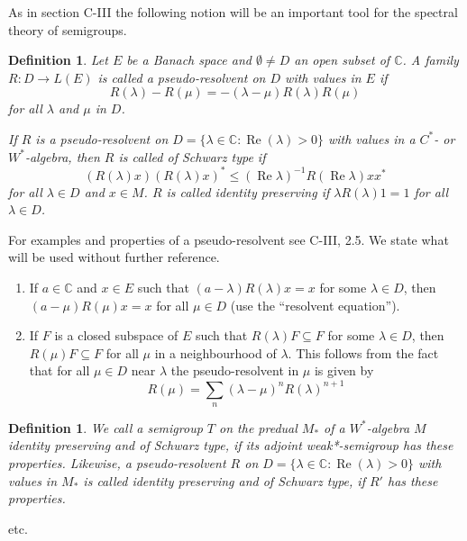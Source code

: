 \documentclass[a4paper, fontsize=11pt, oneside]{scrbook}
\newtheorem{definition}[theorem]{Definition}
\begin{document}
As in section C-III the following notion will be an important tool for the spectral theory of semigroups.

\begin{definition} 
Let $E$ be a Banach space and $\emptyset \neq D$ an open subset of $\mathbb{C}$.
A family $R: D \rightarrow L(E)$ is called a pseudo-resolvent on $D$ with values in $E$ if
\[
R(\lambda)-R(\mu)=-(\lambda-\mu)R(\lambda)R(\mu)
\]
for all $\lambda$ and $\mu$ in $D$.

If $R$ is a pseudo-resolvent on $D=\{\lambda \in \mathbb{C}: \operatorname{Re}(\lambda) > 0\}$ with values in a $C^{*}$- or $W^{*}$-algebra, then $R$ is called of Schwarz type if
\[
(R(\lambda)x)(R(\lambda)x)^{*} \leq (\operatorname{Re}\lambda)^{-1}R(\operatorname{Re}\lambda)xx^{*}
\]
for all $\lambda \in D$ and $x \in M$.
$R$ is called identity preserving if $\lambda R(\lambda)1 = 1$ for all $\lambda \in D$.
\end{definition}

For examples and properties of a pseudo-resolvent see C-III, 2.5.
We state what will be used without further reference.

\begin{enumerate}
\item
If $a \in \mathbb{C}$ and $x \in E$ such that $(a-\lambda)R(\lambda)x = x$ for some $\lambda \in D$, then $(a-\mu)R(\mu)x = x$ for all $\mu \in D$ (use the \enquote{resolvent equation}).

\item
If $F$ is a closed subspace of $E$ such that $R(\lambda)F \subseteq F$ for some $\lambda \in D$, then $R(\mu)F \subseteq F$ for all $\mu$ in a neighbourhood of $\lambda$.
This follows from the fact that for all $\mu \in D$ near $\lambda$ the pseudo-resolvent in $\mu$ is given by
\[
R(\mu) = \sum_{n}(\lambda-\mu)^n R(\lambda)^{n+1}
\]

\end{enumerate}

 
\begin{definition} 
We call a semigroup $T$ on the predual $M_{*}$ of a $W^{*}$-algebra $M$ identity preserving and of Schwarz type, if its adjoint weak*-semigroup has these properties.
Likewise, a pseudo-resolvent $R$ on $D=\{\lambda \in \mathbb{C}: \operatorname{Re}(\lambda)>0\}$ with values in $M_{*}$ is called identity preserving and of Schwarz type, if $R'$ has these properties.
\end{definition}

etc.
\end{document}
